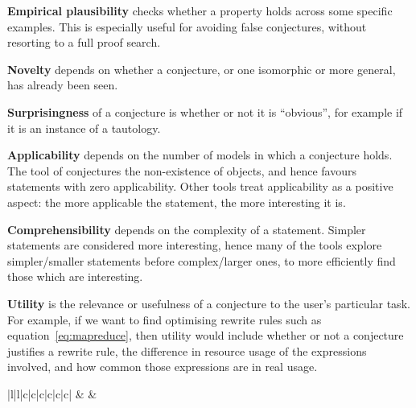 {\bf Empirical plausibility} checks whether a property holds across some
specific examples. This is especially useful for avoiding false conjectures,
without resorting to a full proof search.

{\bf Novelty} depends on whether a conjecture, or one isomorphic or more
general, has already been seen.

{\bf Surprisingness} of a conjecture is whether or not it is
``obvious'', for example if it is an instance of a tautology.

{\bf Applicability} depends on the number of models in which a
conjecture holds. The tool of \Bagai{} conjectures the non-existence of
objects, and hence favours statements with zero applicability. Other tools treat
applicability as a positive aspect: the more applicable the statement, the more
interesting it is.

{\bf Comprehensibility} depends on the complexity of a statement. Simpler
statements are considered more interesting, hence many of the tools explore
simpler/smaller statements before complex/larger ones, to more efficiently find
those which are interesting.

{\bf Utility} is the relevance or usefulness of a conjecture to the
user's particular task. For example, if we want to find optimising
rewrite rules such as equation~\ref{eq:mapreduce}, then utility would include
whether or not a conjecture justifies a rewrite rule, the difference in
resource usage of the expressions involved, and how common those
expressions are in real usage.

\begin{table}
  \centering
  \begin{tabular}{ |l|l|c|c|c|c|c|c| }
    \hline
                          &
                 &
     \\ \hhline{~~------}
    \tRow{          &                     & \iE & \iN & \iS & \iA & \iC & \iU}
  \end{tabular}
  \caption{Classification of MTE tools from~\cite{colton2000notion}, extended
    to include four more recent tools. The interestingness measures are
    \iE{}mpirical plausibility, \iN{}ovelty, \iS{}urprisingness,
    \iA{}pplicability, \iC{}omprehensibility (low complexity) and \iU{}tility.}
  \label{table:colton}
\end{table}

